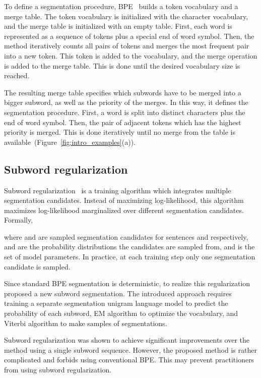 \documentclass[11pt,a4paper]{article}
\begin{document}
To define a segmentation procedure, BPE~\cite{sennrich-etal-2016-neural} builds a token vocabulary and a merge table.
The token vocabulary is initialized with the character vocabulary, and the merge table is initialized with an empty table. First, each word is represented as a sequence of tokens plus a special end of word symbol. Then, the method iteratively counts all pairs of tokens and merges the most frequent pair into a new token. This token is added to the vocabulary, and the merge operation is added to the merge table. This is done until the desired vocabulary size is reached. 

The resulting merge table specifies which subwords have to be merged into a bigger subword, as well as the priority of the merges. In this way, it defines the segmentation procedure. First, a word is split into distinct characters plus the end of word symbol. Then, the pair of adjacent tokens which has the highest priority is merged. This is done iteratively until no merge from the table is available~(Figure~\ref{fig:intro_examples}(a)).

\subsection{Subword regularization}\label{sec:subword_reg}

Subword regularization~\cite{sentencepiece} is a training algorithm which integrates multiple segmentation candidates. Instead of maximizing log-likelihood, this algorithm maximizes log-likelihood marginalized over different segmentation candidates. Formally,
\vspace{-2ex}

where  and  are sampled segmentation candidates for sentences  and  respectively,  and  are the probability distributions the candidates are sampled from, and  is the set of model parameters. In practice, at each training step only one segmentation candidate is sampled.

Since standard BPE segmentation is deterministic, to realize this regularization~\citet{sentencepiece} proposed a new subword segmentation. The introduced approach requires training a separate segmentation unigram language model to predict the probability of each subword, EM algorithm to optimize the vocabulary, and Viterbi algorithm to make samples of segmentations.

Subword regularization was shown to achieve significant improvements over the method using a single subword sequence. However, the proposed method is rather complicated and forbids using conventional BPE. This may prevent practitioners from using subword regularization.
\end{document}
